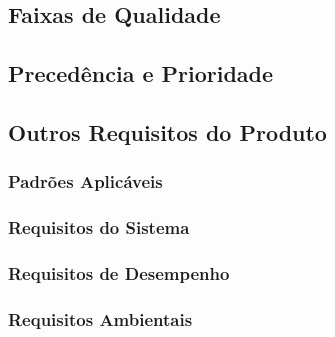 \subsection{Faixas de Qualidade}

\subsection{Precedência e Prioridade}

\subsection{Outros Requisitos do Produto}

\subsubsection{Padrões Aplicáveis}

\subsubsection{Requisitos do Sistema}

\subsubsection{Requisitos de Desempenho}

\subsubsection{Requisitos Ambientais}

